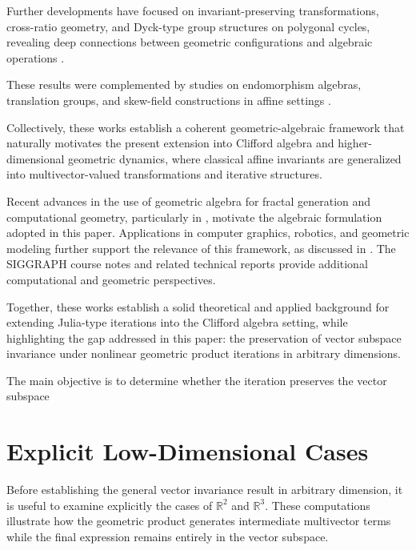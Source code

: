 \documentclass{amsart}
\theoremstyle{plain}
\numberwithin{equation}{section}
\begin{document}
Further developments have focused on invariant-preserving transformations,
cross-ratio geometry, and Dyck-type group structures on polygonal cycles,
revealing deep connections between geometric configurations and algebraic
operations \cite{ZakaPeters2022DyckFreeGroup,ZakaPeters2022InvariantPreserving,
ZakaPeters2025CrosRatio,ZakaPeters2024,PetersZakaFundamentalGroup2023}. 

These results were complemented by studies on endomorphism algebras,
translation groups, and skew-field constructions in affine settings
\cite{ZakaMohammedEndo, ZakaMohammedSF, ZakaPetersIso, ZakaPetersOrder}. 

Collectively, these works establish a coherent geometric-algebraic
framework that naturally motivates the present extension into
Clifford algebra and higher-dimensional geometric dynamics, where
classical affine invariants are generalized into multivector-valued transformations and iterative structures.

Recent advances in the use of geometric algebra for fractal generation and computational geometry, particularly in \cite{Wareham2011,Lasenby2004,Wareham2006,Wareham2008}, motivate the algebraic formulation adopted in this paper. Applications in computer graphics, robotics, and geometric modeling further support the relevance of this framework, as discussed in \cite{Zaka2018,Brannan1999}. The SIGGRAPH course notes \cite{Siggraph2001} and related technical reports \cite{Lasenby2004TR} provide additional computational and geometric perspectives.

Together, these works establish a solid theoretical and applied background for extending Julia-type iterations into the Clifford algebra setting, while highlighting the gap addressed in this paper: the preservation of vector subspace invariance under nonlinear geometric product iterations in arbitrary dimensions.


The main objective is to determine whether the iteration preserves the vector subspace

\section{Explicit Low-Dimensional Cases}

Before establishing the general vector invariance result in arbitrary
dimension, it is useful to examine explicitly the cases of
$\mathbb{R}^{2}$ and $\mathbb{R}^{3}$.
These computations illustrate how the geometric product generates
intermediate multivector terms while the final expression remains
entirely in the vector subspace.
\end{document}

